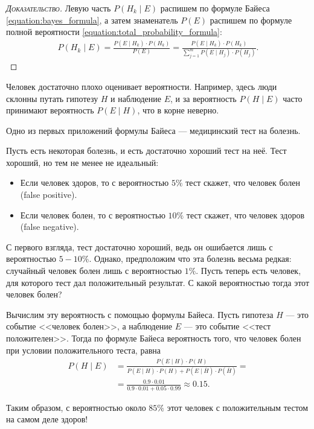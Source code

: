 \documentclass[../main.tex]{subfiles}
\begin{document}
\begin{proof}[\normalfont\textsc{Доказательство}]
 Левую часть $ P(H_k \mid E) $ распишем по формуле Байеса \eqref{equation:bayes_formula}, а затем знаменатель $ P(E) $ распишем по формуле полной вероятности \eqref{equation:total_probability_formula}:
 \begin{align*}
  P(H_k \mid E) = \frac{P(E \mid H_k) \cdot P(H_k)}{P(E)} = \frac{P(E \mid H_k) \cdot P(H_k)}{\sum_{j=1}^{m} P(E \mid H_j) \cdot P(H_j)}.
 \end{align*}
\end{proof}

Человек достаточно плохо оценивает вероятности. Например, здесь люди склонны путать гипотезу $ H $ и наблюдение $ E $, и за вероятность $ P(H \mid E) $ часто принимают вероятность $ P(E \mid H) $, что в корне неверно.

\begin{exmpl*}
 Одно из первых приложений формулы Байеса --- медицинский тест на болезнь. 

 Пусть есть некоторая болезнь, и есть достаточно хороший тест на неё. Тест хороший, но тем не менее не идеальный:
 \begin{itemize}
  \item Если человек здоров, то с вероятностью $ 5 \% $ тест скажет, что человек болен (false positive).
  \item Если человек болен, то с вероятностью $ 10 \% $ тест скажет, что человек здоров (false negative).
 \end{itemize}

 С первого взгляда, тест достаточно хороший, ведь он ошибается лишь с вероятностью $ 5-10 \% $. Однако, предположим что эта болезнь весьма редкая: случайный человек болен лишь с вероятностью $ 1\% $. Пусть теперь есть человек, для которого тест дал положительный результат. С какой вероятностью тогда этот человек болен?

 Вычислим эту вероятность с помощью формулы Байеса. Пусть гипотеза $H$ --- это событие <<человек болен>>, а наблюдение $E$ --- это событие <<тест положителен>>. Тогда по формуле Байеса вероятность того, что человек болен при условии положительного теста, равна
 \begin{align*}
  P(H \mid E) &= \frac{P(E \mid H) \cdot P(H)}{P(E\mid H) \cdot P(H) + P(E\mid \overline H) \cdot P(\overline H)} = \\
  &= \frac{0.9 \cdot 0.01}{0.9 \cdot 0.01 + 0.05 \cdot 0.99} \approx 0.15.
 \end{align*}

 Таким образом, с вероятностью около $ 85\% $ этот человек с положительным тестом на самом деле здоров!
\end{exmpl*}
\end{document}
